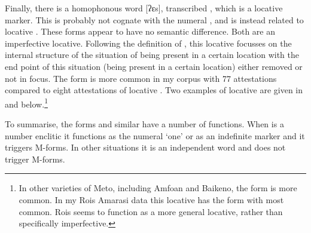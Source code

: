 Finally, there is a homophonous word [ʔɛs],
transcribed , which is a locative marker.
This  is probably not cognate with the numeral ,
and is instead related to locative .
These forms appear to have no semantic difference.
Both are an imperfective locative.
Following the definition of \citep[16]{co76},
this locative focusses on the internal structure of the situation of 
being present in a certain location with the end
point of this situation (being present in a certain location)
either removed or not in focus.
The form  is more common in my corpus with 77 attestations
compared to eight attestations of locative .
Two examples of locative  are given in
 and  below.\footnote{
		In other varieties of Meto, including Amfo{\Q}an and Baikeno,
		the form  is more common.
		In my Ro{\Q}is Amarasi data this locative
		has the form  with  most common.
		Ro{\Q}is  seems to function as a more
		general locative, rather than specifically imperfective.}

\begin{exe}
	\label{ex:130821-1, 0.38}
	\label{ex:130925-1, 1.24}
\end{exe}

To summarise, the forms  and similar  have a number of functions.
When  is a number enclitic it functions as the numeral `one'
or as an indefinite marker and it triggers M-forms.
In other situations it is an independent word and does not trigger M-forms.